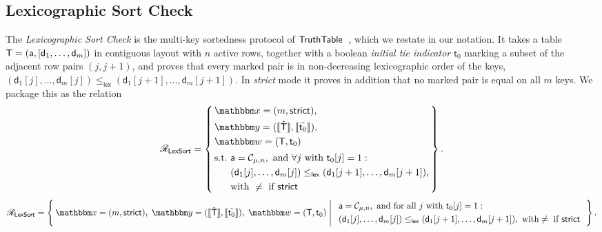 \subsection{Lexicographic Sort Check}
\label{sec:lex-sort}
The \emph{Lexicographic Sort Check} is the multi-key sortedness protocol of $\mathsf{TruthTable}$~\cite{cryptoeprint:2026/1260}, which we restate in our notation. It takes a table $\mathsf{T} = (\mathsf{a}, [\mathsf{d}_1, \dots, \mathsf{d}_m])$ in contiguous layout with $n$ active rows, together with a boolean \emph{initial tie indicator} $\mathsf{t}_0$ marking a subset of the adjacent row pairs $(j, j+1)$, and proves that every marked pair is in non-decreasing lexicographic order of the keys, $(\mathsf{d}_1[j], \dots, \mathsf{d}_m[j]) \le_{\mathsf{lex}} (\mathsf{d}_1[j+1], \dots, \mathsf{d}_m[j+1])$. In \emph{strict} mode it proves in addition that no marked pair is equal on all $m$ keys. We package this as the relation
\ifsp
\begin{displaymath}
\NPRelation_{\mathsf{LexSort}} = \left\{\,
  \begin{aligned}
    & \NPInstance = (m, \mathsf{strict}),\\
    & \NPInstancey = (\Oracle{\hat{\Table}}, \Oracle{\MLE{\mathsf{t}_0}}),\\
    & \NPWitness = (\Table, \mathsf{t}_0)\\[2pt]
    & \text{s.t.}\ \mathsf{a} = \contig_{\mu,n},\ \text{and}\ \forall j\ \text{with}\ \mathsf{t}_0[j] = 1:\\
    & \phantom{\text{s.t.}}\ (\mathsf{d}_1[j], \dots, \mathsf{d}_m[j]) \le_{\mathsf{lex}} (\mathsf{d}_1[j+1], \dots, \mathsf{d}_m[j+1]),\\
    & \phantom{\text{s.t.}}\ \text{with}\ \ne\ \text{if}\ \mathsf{strict}
  \end{aligned}
\,\right\}.
\end{displaymath}
\else
\begin{displaymath}
\NPRelation_{\mathsf{LexSort}} = \left\{\,
  \NPInstance = (m, \mathsf{strict}),\;
  \NPInstancey = (\Oracle{\hat{\Table}}, \Oracle{\MLE{\mathsf{t}_0}}),\;
  \NPWitness = (\Table, \mathsf{t}_0)
  \;\middle|\;
  \begin{array}{l}
    \mathsf{a} = \contig_{\mu,n},\ \text{and for all } j \text{ with } \mathsf{t}_0[j] = 1: \\[3pt]
    (\mathsf{d}_1[j], \dots, \mathsf{d}_m[j]) \le_{\mathsf{lex}} (\mathsf{d}_1[j+1], \dots, \mathsf{d}_m[j+1]),\ \text{with} \ne \text{ if } \mathsf{strict}
  \end{array}
\,\right\}.
\end{displaymath}
